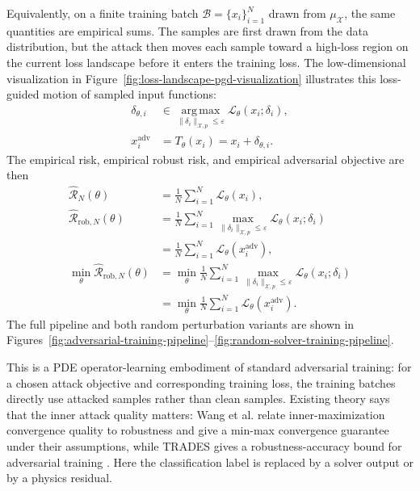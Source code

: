 \documentclass[letterpaper]{article} %
\newcommand{\figref}[1]{Figure~\ref{#1}}
\newcommand{\figrangeref}[2]{Figures~\ref{#1}--\ref{#2}}
\begin{document}
Equivalently, on a finite training batch
\(\mathcal B=\{x_i\}_{i=1}^N\) drawn from \(\mu_{\mathcal X}\), the same
quantities are empirical sums.  The samples are first drawn from the data
distribution, but the attack then moves each sample toward a high-loss region
on the current loss landscape before it enters the training loss.  The
low-dimensional visualization in
\figref{fig:loss-landscape-pgd-visualization} illustrates this
loss-guided motion of sampled input functions:
\begin{align*}
  \delta_{\theta,i}
  &\in
  \operatorname*{arg\,max}_{\|\delta_i\|_{\mathcal X,p}\le\varepsilon}
  \mathcal L_\theta(x_i;\delta_i),\\
  x_i^{\mathrm{adv}}
  &=T_\theta(x_i)=x_i+\delta_{\theta,i}.
\end{align*}
The empirical risk, empirical robust risk, and empirical adversarial objective
are then
\begin{align*}
  \widehat{\mathcal R}_N(\theta)
  &=
  \frac{1}{N}\sum_{i=1}^N
  \mathcal L_\theta(x_i),\\
  \widehat{\mathcal R}_{\mathrm{rob},N}(\theta)
  &=
  \frac{1}{N}\sum_{i=1}^N
  \max_{\|\delta_i\|_{\mathcal X,p}\le\varepsilon}
  \mathcal L_\theta(x_i;\delta_i)\\
  &=
  \frac{1}{N}\sum_{i=1}^N
  \mathcal L_\theta(x_i^{\mathrm{adv}}),\\
  \min_\theta\widehat{\mathcal R}_{\mathrm{rob},N}(\theta)
  &=
  \min_\theta
  \frac{1}{N}\sum_{i=1}^N
  \max_{\|\delta_i\|_{\mathcal X,p}\le\varepsilon}
  \mathcal L_\theta(x_i;\delta_i)\\
  &=
  \min_\theta
  \frac{1}{N}\sum_{i=1}^N
  \mathcal L_\theta(x_i^{\mathrm{adv}}).
\end{align*}
The full pipeline and both random perturbation variants are shown in
\figrangeref{fig:adversarial-training-pipeline}{fig:random-solver-training-pipeline}.

This is a PDE operator-learning embodiment of standard adversarial training:
for a chosen attack objective and corresponding training loss, the training
batches directly use attacked samples rather than clean samples.
Existing theory says that the inner attack quality matters: Wang et al. relate
inner-maximization convergence quality to robustness and give a min-max
convergence guarantee under their assumptions, while TRADES gives a
robustness-accuracy bound for adversarial training
\citep{goodfellow2015explaining,madry2018towards,wang2019convergence,zhang2019trades}.
Here the classification label is replaced by a solver output or by a physics
residual.
\end{document}
